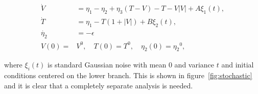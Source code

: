 \begin{equation}\label{eq:stochastic}
\begin{aligned}
\dot{V} & = \eta_1-\eta_2+\eta_3(T-V)-T-V|V|+A\xi_1(t), \\
  \dot{T}   & = \eta_1-T(1+|V|)+B\xi_2(t), \\
 \dot{\eta_2} & = -\epsilon\\
 V(0)=&V^0,\quad T(0)=T^0, \quad \eta_2(0)={\eta_2}^0,
\end{aligned}
\end{equation}

where $\xi_i(t)$ is standard Gaussian noise with mean 0 and variance $t$ and initial conditions centered on the lower branch. This is shown in figure~\ref{fig:stochastic} and it is clear that a completely separate analysis is needed.

